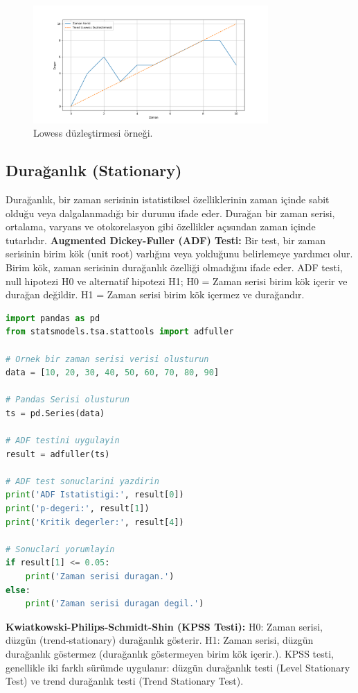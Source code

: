 \begin{figure}[h]
    \centering
    \includegraphics[width=0.8\textwidth]{images/lowess.png}
    \caption{Lowess düzleştirmesi örneği.}
    \label{fig:enter-label}
\end{figure}

\subsection{Durağanlık (Stationary)}
Durağanlık, bir zaman serisinin istatistiksel özelliklerinin zaman içinde sabit olduğu veya dalgalanmadığı bir durumu ifade eder. Durağan bir zaman serisi, ortalama, varyans ve otokorelasyon gibi özellikler açısından zaman içinde tutarlıdır. \textbf{Augmented Dickey-Fuller (ADF) Testi:} Bir test, bir zaman serisinin birim kök (unit root) varlığını veya yokluğunu belirlemeye yardımcı olur. Birim kök, zaman serisinin durağanlık özelliği olmadığını ifade eder. ADF testi, null hipotezi H0 ve alternatif hipotezi H1; H0 = Zaman serisi birim kök içerir ve durağan değildir. H1 = Zaman serisi birim kök içermez ve durağandır.

\begin{lstlisting}[language=Python]
import pandas as pd
from statsmodels.tsa.stattools import adfuller

# Ornek bir zaman serisi verisi olusturun
data = [10, 20, 30, 40, 50, 60, 70, 80, 90]

# Pandas Serisi olusturun
ts = pd.Series(data)

# ADF testini uygulayin
result = adfuller(ts)

# ADF test sonuclarini yazdirin
print('ADF Istatistigi:', result[0])
print('p-degeri:', result[1])
print('Kritik degerler:', result[4])

# Sonuclari yorumlayin
if result[1] <= 0.05:
    print('Zaman serisi duragan.')
else:
    print('Zaman serisi duragan degil.')
\end{lstlisting}

\textbf{Kwiatkowski-Philips-Schmidt-Shin (KPSS Testi):} H0: Zaman serisi, düzgün (trend-stationary) durağanlık gösterir. H1: Zaman serisi, düzgün durağanlık göstermez (durağanlık göstermeyen birim kök içerir.). KPSS testi, genellikle iki farklı sürümde uygulanır: düzgün durağanlık testi (Level Stationary Test) ve trend durağanlık testi (Trend Stationary Test).

